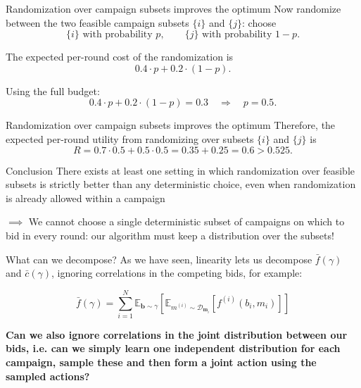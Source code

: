 \begin{frame}{Randomization over campaign subsets improves the optimum}
    Now randomize between the two feasible campaign subsets $\{i\}$ and $\{j\}$: choose
    \[\{i\}\text{ with probability } p,\qquad\{j\}\text{ with probability } 1 - p.\]

    The expected per-round cost of the randomization is
    \[0.4 \cdot p + 0.2 \cdot (1 - p).\]

    Using the full budget:
    \[0.4 \cdot p + 0.2 \cdot (1 - p) = 0.3 \quad \Longrightarrow \quad p = 0.5.\]

\end{frame}

\begin{frame}{Randomization over campaign subsets improves the optimum}
    Therefore, the expected per-round utility from randomizing over subsets $\{i\}$ and $\{j\}$ is
    \[R = 0.7 \cdot 0.5 + 0.5 \cdot 0.5 = 0.35 + 0.25 = \boxed{0.6 > 0.525}.\]

    \begin{alertblock}{Conclusion}
        There exists at least one setting in which randomization over feasible subsets is strictly better than any deterministic choice, even when randomization is already allowed within a campaign
    \end{alertblock}
    $\implies$ We cannot choose a single deterministic subset of campaigns on which to bid in every round: our algorithm must keep a distribution over the subsets!
\end{frame}

\begin{frame}{What can we decompose?}
    As we have seen, linearity lets us decompose $\bar{f}(\gamma)$ and $\bar{c}(\gamma)$, ignoring correlations in the competing bids, for example:

    \[\bar{f}(\gamma) = \sum_{i=1}^N \mathbb{E}_{\mathbf{b} \sim \gamma}\left[ \mathbb{E}_{m^{(i)} \sim \mathcal{D}_{\mathbf{m}_i}}\left[ f^{(i)}(b_i, m_i) \right] \right]\]
     
    \begin{block}{}
        \textbf{Can we also ignore correlations in the joint distribution between our bids, i.e. can we simply learn one independent distribution for each campaign, sample these and then form a joint action using the sampled actions?}
    \end{block}
\end{frame}

